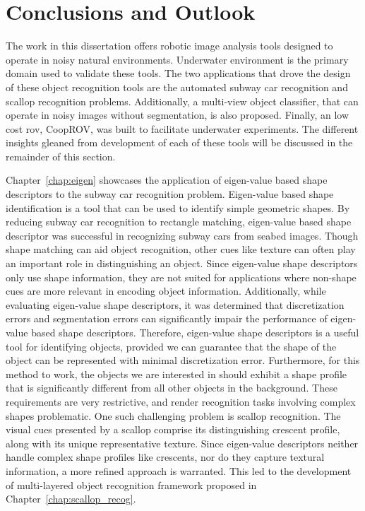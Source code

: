 
\chapter{Conclusions and Outlook}
\label{chap:thesis_conclusion}


The work in this dissertation offers robotic image analysis tools designed to operate in noisy natural environments. 
Underwater environment is the primary domain used to validate these tools.
The two applications that drove the design of these object recognition tools are the automated subway car recognition and scallop recognition problems.
Additionally, a multi-view object classifier, that can operate in noisy images without segmentation, is also proposed.
Finally, an low cost \gls{rov}, CoopROV, was built to facilitate underwater experiments. The different insights gleaned from development of each of these tools will be discussed in the remainder of this section.

Chapter~\ref{chap:eigen} showcases the application of eigen-value based shape descriptors to the subway car recognition problem. 
Eigen-value based shape identification is a tool that can be used to identify simple geometric shapes. 
By reducing subway car recognition to rectangle matching, eigen-value based shape descriptor was
successful in recognizing subway cars from seabed images.
Though shape matching can aid object recognition, other cues like texture can often play an important role
in distinguishing an object. Since eigen-value shape descriptors only use shape information, 
they are not suited for applications where non-shape cues are more relevant in encoding object information. 
Additionally, while evaluating eigen-value shape descriptors, it was determined that 
discretization errors and segmentation errors can significantly impair the performance of eigen-value based shape descriptors.
Therefore, eigen-value shape descriptors is a useful tool for identifying
objects, provided we can guarantee that the shape of the object can be represented with minimal discretization error. 
Furthermore, for this method to work, the objects
we are interested in should exhibit a shape profile that is significantly different from
all other objects in the background. These requirements are very restrictive, and render recognition tasks involving 
complex shapes problematic. One such challenging problem is scallop recognition.
The visual cues presented by a scallop comprise its distinguishing crescent profile, along with its unique representative texture.
Since eigen-value descriptors neither handle complex shape profiles like crescents, nor do they capture textural information,
a more refined approach is warranted.
This led to the development of multi-layered object recognition framework proposed in Chapter~\ref{chap:scallop_recog}.


